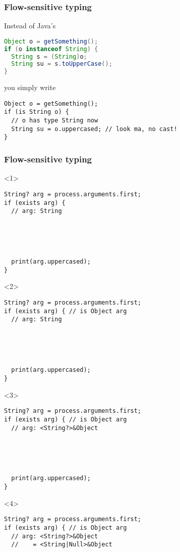\documentclass[aspectratio=169]{beamer}
\begin{document}
\begin{frame}[fragile]
  \frametitle{Flow-sensitive typing}
  Instead of Java’s
  \begin{lstlisting}[language=java]
Object o = getSomething();
if (o instanceof String) {
  String s = (String)o;
  String su = s.toUpperCase();
}
  \end{lstlisting}
  \pause
  you simply write
  \begin{lstlisting}
Object o = getSomething();
if (is String o) {
  // o has type String now
  String su = o.uppercased; // look ma, no cast!
}
  \end{lstlisting}
\end{frame}

\begin{frame}[fragile]
  \frametitle{Flow-sensitive typing}
  \begin{onlyenv}<1>
    \begin{lstlisting}
String? arg = process.arguments.first;
if (exists arg) {
  // arg: String





  print(arg.uppercased);
}
    \end{lstlisting}
  \end{onlyenv}
  \begin{onlyenv}<2>
    \begin{lstlisting}
String? arg = process.arguments.first;
if (exists arg) { // is Object arg
  // arg: String





  print(arg.uppercased);
}
    \end{lstlisting}
  \end{onlyenv}
  \begin{onlyenv}<3>
    \begin{lstlisting}
String? arg = process.arguments.first;
if (exists arg) { // is Object arg
  // arg: <String?>&Object





  print(arg.uppercased);
}
    \end{lstlisting}
  \end{onlyenv}
  \begin{onlyenv}<4>
    \begin{lstlisting}
String? arg = process.arguments.first;
if (exists arg) { // is Object arg
  // arg: <String?>&Object
  //    = <String|Null>&Object





\end{lstlisting}
\end{onlyenv}
\end{frame}
\end{document}
